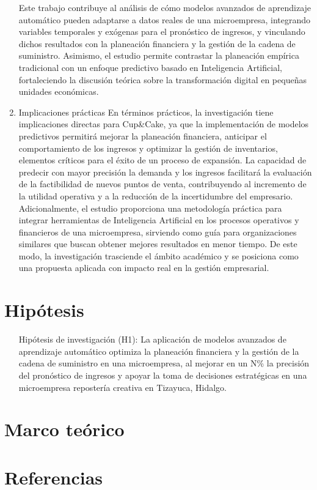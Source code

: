 \documentclass[12pt]{book}
\begin{document}
\begin{enumerate}
Este trabajo contribuye al análisis de cómo modelos avanzados de aprendizaje automático pueden adaptarse a datos reales de una microempresa, integrando variables temporales y exógenas para el pronóstico de ingresos, y vinculando dichos resultados con la planeación financiera y la gestión de la cadena de suministro. Asimismo, el estudio permite contrastar la planeación empírica tradicional con un enfoque predictivo basado en Inteligencia Artificial, fortaleciendo la discusión teórica sobre la transformación digital en pequeñas unidades económicas.
\item Implicaciones prácticas
En términos prácticos, la investigación tiene implicaciones directas para Cup&Cake, ya que la implementación de modelos predictivos permitirá mejorar la planeación financiera, anticipar el comportamiento de los ingresos y optimizar la gestión de inventarios, elementos críticos para el éxito de un proceso de expansión. La capacidad de predecir con mayor precisión la demanda y los ingresos facilitará la evaluación de la factibilidad de nuevos puntos de venta, contribuyendo al incremento de la utilidad operativa y a la reducción de la incertidumbre del empresario.
Adicionalmente, el estudio proporciona una metodología práctica para integrar herramientas de Inteligencia Artificial en los procesos operativos y financieros de una microempresa, sirviendo como guía para organizaciones similares que buscan obtener mejores resultados en menor tiempo. De este modo, la investigación trasciende el ámbito académico y se posiciona como una propuesta aplicada con impacto real en la gestión empresarial.
\end{enumerate}

\section*{Hipótesis}
\begin{itemize}
    \item[Hipótesis de investigación (H1):] La aplicación de modelos avanzados de aprendizaje automático optimiza la planeación financiera y la gestión de la cadena de suministro en una microempresa, al mejorar en un N\% la precisión del pronóstico de ingresos y apoyar la toma de decisiones estratégicas en una microempresa repostería creativa en Tizayuca, Hidalgo.
\end{itemize}

\section*{Marco teórico}

\section*{Referencias}
\printbibliography[heading=none]
\end{document}
